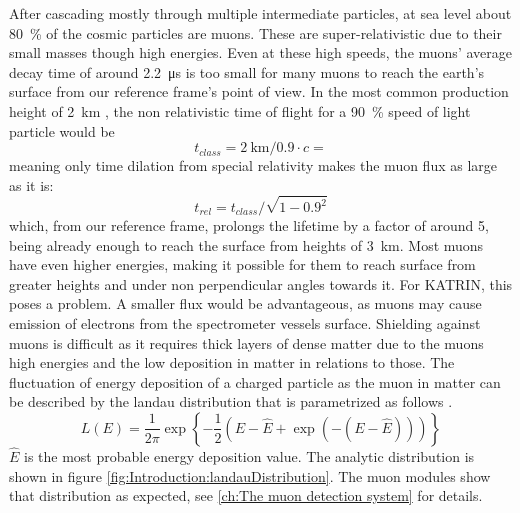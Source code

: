 	After cascading mostly through multiple intermediate particles, at sea level about \SI{80}{\percent} of the cosmic particles are muons. These are super-relativistic due to their small masses though high energies. Even at these high speeds, the muons' average decay time of around \SI{2.2}{\micro\second} \cite{muonLifetime} is too small for many muons to reach the earth's surface from our reference frame's point of view. In the most common production height of \SI{2}{\kilo\meter} \cite{muonProductionHeight}, the non relativistic time of flight for a \SI{90}{\percent} speed of light particle would be
    \begin{equation}
	t_{class} = \SI{2}{\kilo\meter} / 0.9\cdot c = 
    \end{equation}
    meaning only time dilation from special relativity makes the muon flux as large as it is:
    \begin{equation}
    	t_{rel} = t_{class} / \sqrt{1-0.9^2}
    \end{equation}
    which, from our reference frame, prolongs the lifetime by a factor of around 5, being already enough to reach the surface from heights of \SI{3}{\kilo\meter}. Most muons have even higher energies, making it possible for them to reach surface from greater heights and under non perpendicular angles towards it.
    For KATRIN, this poses a problem. A smaller flux would be advantageous, as muons may cause emission of electrons from the spectrometer vessels surface. Shielding against muons is difficult as it requires thick layers of dense matter due to the muons high energies and the low deposition in matter in relations to those.
    The fluctuation of energy deposition of a charged particle as the muon in matter can be described by the landau distribution that is parametrized as follows \cite{Grupen}.
    \begin{equation}
    	L(E) = \frac{1}{2\pi}\exp{\left\{-\frac{1}{2}\left(E- \hat E + \exp \left(-(E-\hat E)\right)\right)\right\}}
    \end{equation}
	$\hat E$ is the most probable energy deposition value. The analytic distribution is shown in figure \ref{fig:Introduction:landauDistribution}. The muon modules show that distribution as expected, see \ref{ch:The muon detection system} for details.
